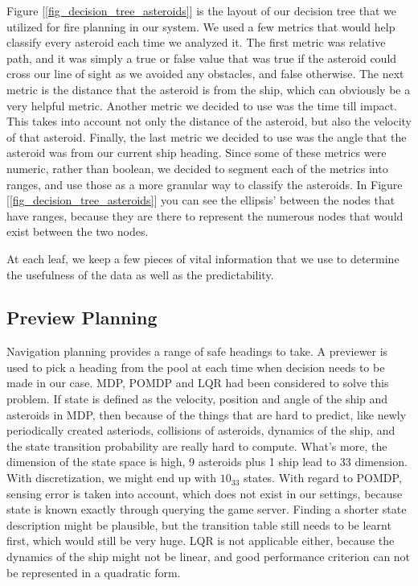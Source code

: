 \documentclass[10pt,final,conference]{IEEEtran}
\begin{document}
Figure [\ref{fig_decision_tree_asteroids}] is the layout of our decision tree that we utilized for fire planning in our system.  We used a few metrics that would help classify every asteroid each time we analyzed it.  The first metric was relative path, and it was simply a true or false value that was true if the asteroid could cross our line of sight as we avoided any obstacles, and false otherwise.  The next metric is the distance that the asteroid is from the ship, which can obviously be a very helpful metric.  Another metric we decided to use was the time till impact.  This takes into account not only the distance of the asteroid, but also the velocity of that asteroid.  Finally, the last metric we decided to use was the angle that the asteroid was from our current ship heading.  Since some of these metrics were numeric, rather than boolean, we decided to segment each of the metrics into ranges, and use those as a more granular way to classify the asteroids.  In Figure [\ref{fig_decision_tree_asteroids}] you can see the ellipsis' between the nodes that have ranges, because they are there to represent the numerous nodes that would exist between the two nodes.

At each leaf, we keep a few pieces of vital information that we use to determine the usefulness of the data as well as the predictability.  

\subsection{Preview Planning}
Navigation planning provides a range of safe headings to take. A previewer is used to pick a heading from the pool at each time when decision needs to be made in our case. MDP, POMDP and LQR had been considered to solve this problem. If state is defined as the velocity, position and angle of the ship and asteroids in MDP, then because of the things that are hard to predict, like newly periodically created asteriods, collisions of asteroids, dynamics of the ship, and the state transition probability are really hard to compute. What's more, the dimension of the state space is high, 9 asteroids plus 1 ship lead to 33 dimension. With discretization, we might end up with $10_33$ states. With regard to POMDP, sensing error is taken into account, which does not exist in our settings, because state is known exactly through querying the game server. Finding a shorter state description might be plausible, but the transition table still needs to be learnt first, which would still be very huge. LQR is not applicable either, because the dynamics of the ship might not be linear, and good performance criterion can not be represented in a quadratic form.
\end{document}
